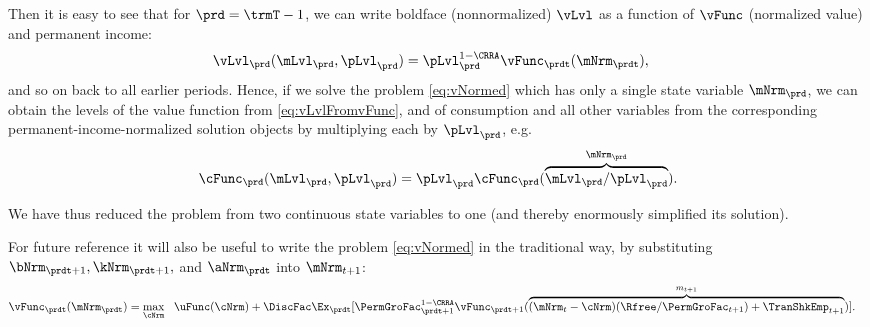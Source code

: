 \documentclass[\econtexRoot/SolvingMicroDSOPs]{subfiles}
\begin{document}
Then it is easy to see that for $\prd=\trmT-1$, we can write boldface (nonnormalized) $\vLvl$ as a function of $\vFunc$ (normalized value) and permanent income:
\begin{equation}\begin{gathered}\begin{aligned}
      \vLvl_{\prd}(\mLvl_{\prd},\pLvl_{\prd}) & =  \pLvl_{\prd}^{1-\CRRA}\vFunc_{\prdt}(\mNrm_{\prdt}), \label{eq:vLvlFromvFunc}
    \end{aligned}\end{gathered}\end{equation}
and so on back to all earlier periods.  Hence, if we solve the problem \eqref{eq:vNormed} which has only a single state variable $\mNrm_{\prd}$, we can obtain the levels of the value function from \eqref{eq:vLvlFromvFunc}, and of consumption and all other variables from the corresponding permanent-income-normalized solution objects by multiplying each by $\pLvl_{\prd}$, e.g.\
\begin{equation*}\begin{gathered}\begin{aligned}
  \cFunc_{\prd}(\mLvl_{\prd},\pLvl_{\prd})=\pLvl_{\prd}\cFunc_{\prd}(\overbrace{\mLvl_{\prd}/\pLvl_{\prd}}^{\mNrm_{\prd}}).
    \end{aligned}\end{gathered}\end{equation*}

We have thus reduced the problem from two continuous state variables to one (and thereby enormously simplified its solution).

For future reference it will also be useful to write the problem \eqref{eq:vNormed} in the traditional way, by substituting $\bNrm_{\prdt+1},\kNrm_{\prdt+1},$ and $\aNrm_{\prdt}$ into $\mNrm_{t+1}$:
\begin{equation}\begin{gathered}\begin{aligned}
      \vFunc_{\prdt}(\mNrm_{\prdt}) & = \max_{\cNrm} ~~ \uFunc(\cNrm)+ \DiscFac \Ex_{\prdt}[ \PermGroFac_{\prdt+1}^{1-\CRRA}\vFunc_{\prdt+1}(\overbrace{(\mNrm_{t}-\cNrm)(\Rfree/\PermGroFac_{t+1})+\TranShkEmp_{t+1}}^{m_{t+1}})] \label{eq:vusual}.
    \end{aligned}\end{gathered}\end{equation}
\end{document}

